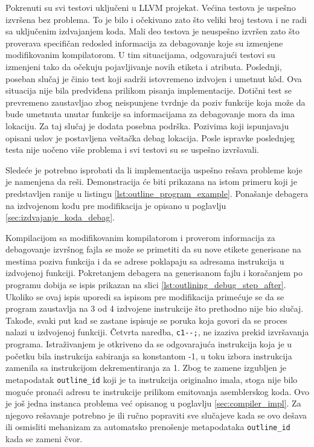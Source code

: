 \documentclass[12pt,oneside]{memoir}
\begin{document}
Pokrenuti su svi testovi uključeni u LLVM projekat. %
Većina testova je uspešno izvršena bez problema. To je bilo i očekivano zato što veliki broj testova i ne radi sa uključenim izdvajanjem koda.
Mali deo testova je neuspešno izvršen zato što proverava specifičan redosled informacija za debagovanje koje su izmenjene modifikovanim kompilatorom.
U tim situacijama, odgovarajući testovi su izmenjeni tako da očekuju pojavljivanje novih etiketa i atributa.
Poslednji, poseban slučaj je činio test koji sadrži istovremeno izdvojen i umetnut k\^od.
Ova situacija nije bila predviđena prilikom pisanja implementacije.
Dotični test se prevremeno zaustavljao zbog neispunjene tvrdnje da poziv funkcije koja može da bude umetnuta unutar funkcije sa informacijama za debagovanje mora da ima lokaciju.
Za taj slučaj je dodata posebna podrška.
Pozivima koji ispunjavaju opisani uslov je postavljena veštačka debag lokacija.
Posle ispravke poslednjeg testa nije uočeno više problema i svi testovi su se uspešno izvršavali.

Sledeće je potrebno isprobati da li implementacija uspešno rešava probleme koje je namenjena da reši.
Demonstracija će biti prikazana na istom primeru koji je predstavljen ranije u listingu \ref{lst:outline_program_example}.
Ponašanje debagera na izdvojenom kodu pre modifikacija je opisano u poglavlju \ref{sec:izdvajanje_koda_debag}.

Kompilacijom sa modifikovanim kompilatorom i proverom informacija za debagovanje izvršnog fajla se može se primetiti da su nove etikete generisane na mestima poziva funkcija i da se adrese poklapaju sa adresama instrukcija u izdvojenoj funkciji.
Pokretanjem debagera na generisanom fajlu i koračanjem po programu dobija se ispis prikazan na slici \ref{lst:outlining_debug_step_after}.
Ukoliko se ovaj ispis uporedi sa ispisom pre modifikacija primećuje se da se program zaustavlja na 3 od 4 izdvojene instrukcije što prethodno nije bio slučaj.
Takođe, svaki put kad se zastane ispisuje se poruka koja govori da se proces nalazi u izdvojenoj funkciji.
Četvrta naredba, \verb|c1--;|, ne izaziva prekid izvršavanja programa.
Istraživanjem je otkriveno da se odgovarajuća instrukcija koja je u početku bila instrukcija sabiranja sa konstantom -1, u toku izbora instrukcija zamenila sa instrukcijom dekrementiranja za 1.
Zbog te zamene izgubljen je metapodatak \verb|outline_id| koji je ta instrukcija originalno imala, stoga nije bilo moguće pronaći adresu te instrukcije prilikom emitovanja asemblerskog koda.
Ovo je još jedna instanca problema već opisanog u poglavlju \ref{sec:compiler_impl}.
Za njegovo rešavanje potrebno je ili ručno popraviti sve slučajeve kada se ovo dešava ili osmisliti mehanizam za automatsko prenošenje metapodataka \verb|outline_id| kada se zameni čvor.
\end{document}

